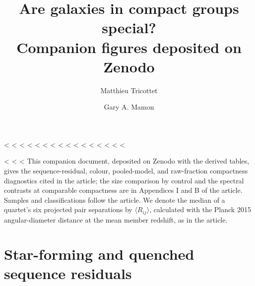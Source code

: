 \documentclass{aa}
\begin{document}
<%
<%
<%
<%
<%
<%
<%
<%
<%
<%
<%
<%
<%
<%
<%
<%

\title{Are galaxies in compact groups special?\\Companion figures deposited on Zenodo}
\author{Matthieu Tricottet \and Gary A. Mamon}
\date{}
\maketitle

<%
<%
<%
This companion document, deposited on Zenodo with the derived tables, gives the sequence-residual, colour, pooled-model, and raw-fraction compactness diagnostics cited in the article; the size comparison by control and the spectral contrasts at comparable compactness are in Appendices I and B of the article. Samples and classifications follow the article. We denote the median of a quartet's six projected pair separations by \(\langle R_{ij}\rangle\), calculated with the Planck 2015 angular-diameter distance at the mean member redshift, as in the article.

\FloatBarrier
\section{Star-forming and quenched sequence residuals}
\end{document}
